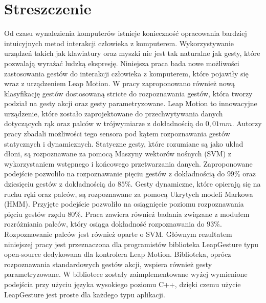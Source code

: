 \chapter{Streszczenie}
Od czasu wynalezienia komputerów istnieje konieczność opracowania bardziej intuicyjnych metod interakcji człowieka z komputerem.
Wykorzystywanie urządzeń takich jak klawiatury oraz myszki nie jest tak naturalne jak gesty, które pozwalają wyrażać ludzką ekspresję.
Niniejsza praca bada nowe możliwości zastosowania gestów do interakcji człowieka z komputerem, które pojawiły się wraz z urządzeniem Leap Motion.
W pracy zaproponowano również nową klasyfikację gestów dostosowaną stricte do rozpoznawania gestów, która tworzy podział na gesty akcji oraz gesty parametryzowane.
Leap Motion to innowacyjne urządzenie, które zostało zaprojektowane do przechwytywania danych dotyczących rąk oraz palców w trójwymiarze z dokładnością do $0,01mm$.
Autorzy pracy zbadali możliwości tego sensora pod kątem rozpoznawania gestów statycznych i dynamicznych.
Statyczne gesty, które rozumiane są jako układ dłoni, są rozpoznawane za pomocą Maszyny wektorów nośnych (SVM) z wykorzystaniem wstępnego i końcowego przetwarzania danych.
Zaproponowane podejście pozwoliło na rozpoznawanie pięciu gestów z dokładnością do $99\%$ oraz dziesięciu gestów z dokładnością do $85\%$.
Gesty dynamiczne, które opierają się na ruchu ręki oraz palców, są rozpoznawane za pomocą Ukrytych modeli Markowa (HMM).
Przyjęte podejście pozwoliło na osiągnięcie poziomu rozpoznawania pięciu gestów rzędu $80\%$.
Praca zawiera również badania związane z modułem rozróżniania palców, który osiąga dokładność rozpoznawania do $93\%$. Rozpoznawanie palców jest również oparte o SVM.
Głównym rezultatem niniejszej pracy jest przeznaczona dla programistów biblioteka LeapGesture typu open-source dedykowana dla kontrolera Leap Motion. Biblioteka, oprócz rozpoznawania standardowych gestów akcji, wspiera również gesty parametryzowane. W bibliotece zostały zaimplementowane wyżej wymienione podejścia przy użyciu języka wysokiego poziomu C++, dzięki czemu użycie LeapGesture jest proste dla każdego typu aplikacji.

